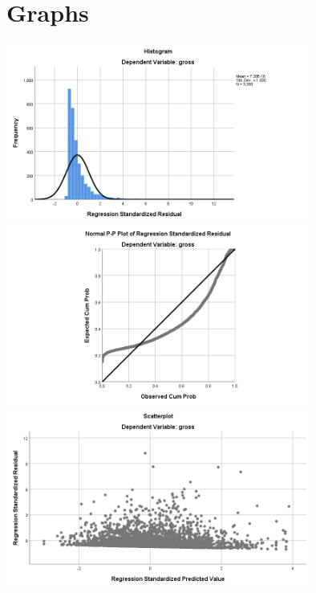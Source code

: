 \documentclass[font=10pt]{article}
\begin{document}
  \section{Graphs}
  \includegraphics[width=10cm]{graph1}
  \includegraphics[width=10cm]{graph2}
  \includegraphics[width=10cm]{graph3}
\end{document}
